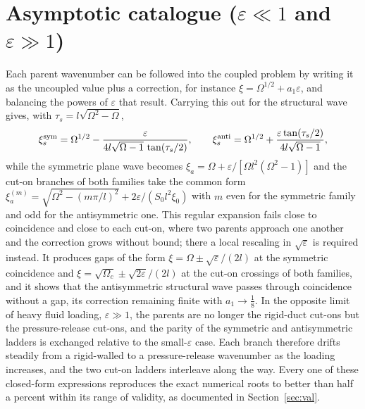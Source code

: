 \documentclass[11pt]{article}
\newcommand{\Om}{\Omega}
\newcommand{\eps}{\varepsilon}
\begin{document}
\section{Asymptotic catalogue ($\eps\ll1$ and $\eps\gg1$)}
Each parent wavenumber can be followed into the coupled problem by writing it as the uncoupled value
plus a correction, for instance $\xi=\Om^{1/2}+a_1\eps$, and balancing the powers of $\eps$ that result.
Carrying this out for the structural wave gives, with $\tau_s=l\sqrt{\Om^2-\Om}$,
\begin{equation}
\xi_s^{\rm sym}=\Om^{1/2}-\frac{\eps}{4l\sqrt{\Om-1}\,\tan(\tau_s/2)},\qquad
\xi_s^{\rm anti}=\Om^{1/2}+\frac{\eps\tan(\tau_s/2)}{4l\sqrt{\Om-1}},
\end{equation}
while the symmetric plane wave becomes $\xi_a=\Om+\eps/[\Om l^2(\Om^2-1)]$ and the cut-on branches of
both families take the common form $\xi_a^{(m)}=\sqrt{\Om^2-(m\pi/l)^2}+2\eps/(S_0l^2\xi_0)$ with $m$
even for the symmetric family and odd for the antisymmetric one. This regular expansion fails close to
coincidence and close to each cut-on, where two parents approach one another and the correction grows
without bound; there a local rescaling in $\sqrt{\eps}$ is required instead. It produces gaps of the
form $\xi=\Om\pm\sqrt{\eps}/(2l)$ at the symmetric coincidence and $\xi=\sqrt{\Om_c}\pm\sqrt{2\eps}/(2l)$
at the cut-on crossings of both families, and it shows that the antisymmetric structural wave passes
through coincidence without a gap, its correction remaining finite with $a_1\to\tfrac18$. In the
opposite limit of heavy fluid loading, $\eps\gg1$, the parents are no longer the rigid-duct cut-ons but
the pressure-release cut-ons, and the parity of the symmetric and antisymmetric ladders is exchanged
relative to the small-$\eps$ case. Each branch therefore drifts steadily from a rigid-walled to a
pressure-release wavenumber as the loading increases, and the two cut-on ladders interleave along the
way. Every one of these closed-form expressions reproduces the exact numerical roots to better than half
a percent within its range of validity, as documented in Section~\ref{sec:val}.
\end{document}
